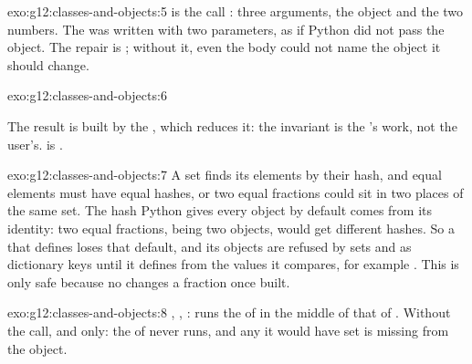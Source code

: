 \begin{solution}{exo:g12:classes-and-objects:5}
 is the call : three arguments, the object and the two numbers. The
 was written with two parameters, as if Python did not pass the object. The repair is
; without it, even the body could not name the object it should change.
\end{solution}

\begin{solution}{exo:g12:classes-and-objects:6}
\smallskip\noindent\hspace*{2em}

\noindent\hspace*{4em}

\noindent\hspace*{4em}

\smallskip\noindent The result is built by the , which reduces it: the invariant is the 's work, not
the user's.  is .
\end{solution}

\begin{solution}{exo:g12:classes-and-objects:7}
A set finds its elements by their hash, and equal elements must have equal hashes, or two equal fractions could sit
in two places of the same set. The hash Python gives every object by default comes from its identity: two equal
fractions, being two objects, would get different hashes. So a  that defines  loses that default,
and its objects are refused by sets and as dictionary keys until it defines  from the values it
compares, for example . This is only safe because no  changes a
fraction once built.
\end{solution}

\begin{solution}{exo:g12:classes-and-objects:8}
, , :  runs the  of  in the middle of that
of . Without the call,  and  only: the  of  never runs, and any
 it would have set is missing from the object.
\end{solution}

